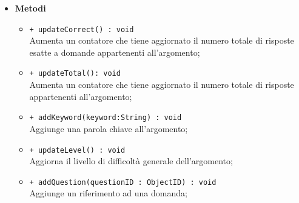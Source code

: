 \begin{itemize}
\begin{itemize}
\begin{itemize}
				\end{itemize}
		\end{itemize}
	\item \textbf{Metodi}
		\begin{itemize}
			\item \texttt{+ updateCorrect() : void} \\
			Aumenta un contatore che tiene aggiornato il numero totale di risposte esatte a domande appartenenti all'argomento;
			\item \texttt{+ updateTotal(): void} \\
			Aumenta un contatore che tiene aggiornato il numero totale di risposte appartenenti all'argomento;
			\item \texttt{+ addKeyword(keyword:String) : void} \\
			Aggiunge una parola chiave all'argomento;
			\item \texttt{+ updateLevel() : void} \\
			Aggiorna il livello di difficoltà generale dell'argomento;
			\item \texttt{+ addQuestion(questionID : ObjectID) : void} \\
			Aggiunge un riferimento ad una domanda;
		\end{itemize}
\end{itemize}